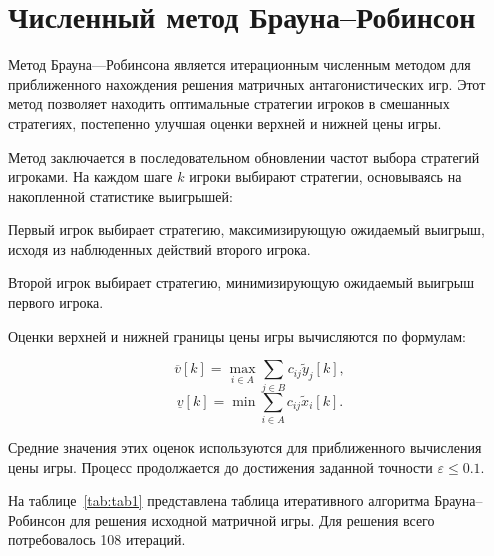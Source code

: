 \section{Численный метод Брауна--Робинсон}

Метод Брауна—Робинсона является итерационным численным методом для приближенного
нахождения решения матричных антагонистических игр. Этот метод позволяет находить
оптимальные стратегии игроков в смешанных стратегиях, постепенно улучшая оценки
верхней и нижней цены игры.

Метод заключается в последовательном обновлении частот выбора стратегий игроками.
На каждом шаге $k$ игроки выбирают стратегии, основываясь на накопленной статистике выигрышей:

Первый игрок выбирает стратегию, максимизирующую ожидаемый выигрыш, исходя из наблюденных
действий второго игрока.

Второй игрок выбирает стратегию, минимизирующую ожидаемый выигрыш первого игрока.

Оценки верхней и нижней границы цены игры вычисляются по формулам:

\begin{equation}
  \overline{v}[k] = \max_{i \in A} \sum_{j \in B} c_{ij} \tilde{y}_j[k],
\end{equation}
\begin{equation}
  \underline{v}[k] = \min{\sum_{i \in A} c_{ij} \tilde{x}_i[k]}.
\end{equation}

Средние значения этих оценок используются для приближенного вычисления цены игры.
Процесс продолжается до достижения заданной точности $\varepsilon \leq 0.1$.

На таблице~\ref{tab:tab1} представлена таблица итеративного алгоритма Брауна--Робинсон
для решения исходной матричной игры. Для решения всего потребовалось 108 итераций.


